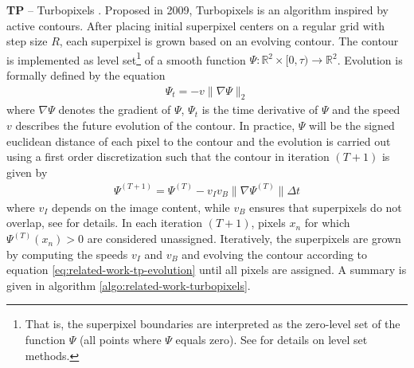 \textbf{TP} -- Turbopixels \cite{LevinshteinStereKutulakosFleetDickinsonSiddiqi:2009}. Proposed in 2009, Turbopixels is an algorithm inspired by active contours. After placing initial superpixel centers on a regular grid with step size $R$, each superpixel is grown based on an evolving contour. The contour is implemented as level set\footnote{That is, the superpixel boundaries are interpreted as the zero-level set of the function $\Psi$ (all points where $\Psi$ equals zero). See \cite{OsherFedkiw:2003} for details on level set methods.} of a smooth function $\Psi : \mathbb{R}^2 \times [0,\tau) \rightarrow \mathbb{R}^2$. Evolution is formally defined by the equation
\begin{align}
	\Psi_t = -  v \|\nabla\Psi\|_2
\end{align}
where $\nabla\Psi$ denotes the gradient of $\Psi$, $\Psi_t$ is the time derivative of $\Psi$ and the speed $v$ describes the future evolution of the contour. In practice, $\Psi$ will be the signed euclidean distance of each pixel to the contour \cite{LevinshteinStereKutulakosFleetDickinsonSiddiqi:2009} and the evolution is carried out using a first order discretization such that the contour in iteration $(T+1)$ is given by
\begin{align}
	\label{eq:related-work-tp-evolution}
	\Psi^{(T+1)} = \Psi^{(T)} - v_I v_B \|\nabla\Psi^{(T)}\| \Delta t
\end{align}
where $v_I$ depends on the image content, while $v_B$ ensures that superpixels do not overlap, see \cite{LevinshteinStereKutulakosFleetDickinsonSiddiqi:2009} for details. In each iteration $(T + 1)$, pixels $x_n$ for which $\Psi^{(T)} (x_n) > 0$ are considered unassigned. Iteratively, the superpixels are grown by computing the speeds $v_I$ and $v_B$ and evolving the contour according to equation \eqref{eq:related-work-tp-evolution} until all pixels are assigned. A summary is given in algorithm \ref{algo:related-work-turbopixels}.
